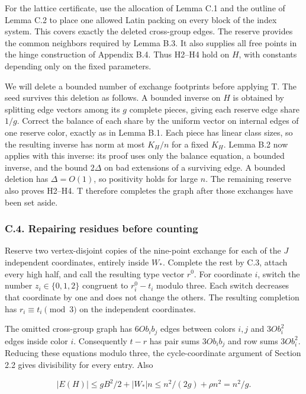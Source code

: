 \documentclass[english,11pt,a4paper]{article}
\begin{document}
For the lattice certificate, use the allocation of Lemma C.1 and the outline of Lemma C.2 to place one allowed Latin packing on every block of the index system. This covers exactly the deleted cross-group edges. The reserve provides the common neighbors required by Lemma B.3. It also supplies all free points in the hinge construction of Appendix B.4. Thus H2--H4 hold on \(H\), with constants depending only on the fixed parameters.

We will delete a bounded number of exchange footprints before applying T. The seed survives this deletion as follows. A bounded inverse on \(H\) is obtained by splitting edge vectors among its \(g\) complete pieces, giving each reserve edge share \(1/g\). Correct the balance of each share by the uniform vector on internal edges of one reserve color, exactly as in Lemma B.1. Each piece has linear class sizes, so the resulting inverse has norm at most \(K_H/n\) for a fixed \(K_H\). Lemma B.2 now applies with this inverse: its proof uses only the balance equation, a bounded inverse, and the bound \(2\Delta\) on bad extensions of a surviving edge. A bounded deletion has \(\Delta=O(1)\), so positivity holds for large \(n\). The remaining reserve also proves H2--H4. T therefore completes the graph after those exchanges have been set aside.

\subsubsection{C.4. Repairing residues before counting}\label{c.4.-repairing-residues-before-counting}

Reserve two vertex-disjoint copies of the nine-point exchange for each of the \(J\) independent coordinates, entirely inside \(W_\ast\). Complete the rest by C.3, attach every high half, and call the resulting type vector \(r^0\). For coordinate \(i\), switch the number \(z_i\in\{0,1,2\}\) congruent to \(r^0_i-t_i\) modulo three. Each switch decreases that coordinate by one and does not change the others. The resulting completion has \(r_i\equiv t_i\pmod3\) on the independent coordinates.

The omitted cross-group graph has \(6O b_ib_j\) edges between colors \(i,j\) and \(3O b_i^2\) edges inside color \(i\). Consequently \(t-r\) has pair sums \(3O b_ib_j\) and row sums \(3O b_i^2\). Reducing these equations modulo three, the cycle-coordinate argument of Section 2.2 gives divisibility for every entry. Also

\[|E(H)|\le gB^2/2+|W_\ast|n\le n^2/(2g)+\rho n^2=n^2/g.\]
\end{document}
